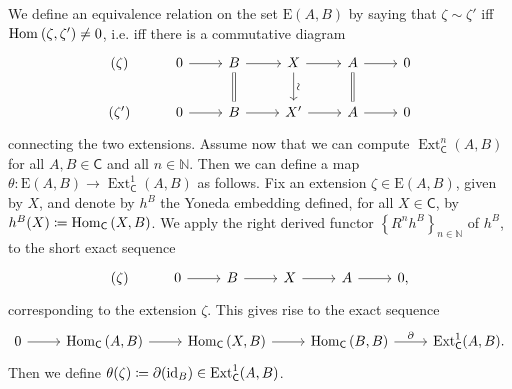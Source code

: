 \begin{rem}[]\label{rem:YonedaExensionTheta}
	We define an equivalence relation on the set $\mathrm{E}(A,B)$ by
	saying that $\zeta \sim \zeta'$ 
	iff $\operatorname{Hom}_{  } \left( \zeta, \zeta' \right) \neq 0$,
	i.e. iff there is a commutative diagram
	\begin{equation*}
	\begin{tikzcd}
		(\zeta) &
		0 \arrow[r, "", rightarrow] &
		B \arrow[r, "", rightarrow] 
		\arrow[d, "", equals] &
		X \arrow[r, "", rightarrow] 
		\arrow[d, "\rotatebox{90}{\(\sim\)}", rightarrow] &
		A \arrow[r, "", rightarrow] 
		\arrow[d, "", equals] &
		0\\
		(\zeta') &
		0 \arrow[r, "", rightarrow] &
		B \arrow[r, "", rightarrow] &
		X' \arrow[r, "", rightarrow] &
		A \arrow[r, "", rightarrow] &
		0
	\end{tikzcd}
	\end{equation*}
	connecting the two extensions.
	Assume now that we can compute $\operatorname{Ext}^n_{\mathsf{C}}(A, B)$
	for all $A,B \in \mathsf{C}$ and all $n \in \mathbb{N}$.
	Then we can define a map $\theta\colon \mathrm{E}(A,B) \to 
	\operatorname{Ext}^1_{\mathsf{C}}(A,B)$ as follows.
	Fix an extension $\zeta \in \mathrm{E}(A,B)$, given by $X$,
	and denote by $h^B$ the Yoneda
	embedding defined, for all $X \in \mathsf{C}$, by
	$h^B(X) \coloneqq \operatorname{Hom}_{\mathsf{C}} \left( X, B \right)$.
	We apply the right derived functor 
	$\left\{ R^n h^B \right\}_{n \in \mathbb{N}}$ of $h^B$, 
	to the short exact sequence
	\begin{equation*}
	\begin{tikzcd}
		(\zeta) &
		0 \arrow[r, "", rightarrow] &
		B \arrow[r, "", rightarrow] &
		X \arrow[r, "", rightarrow] &
		A \arrow[r, "", rightarrow] &
		0
	,\end{tikzcd}
	\end{equation*}
	corresponding to the extension $\zeta$.
	This gives rise to the exact sequence
	\begin{equation*}
	\begin{tikzcd}
		0 \arrow[r, "", rightarrow] &
		\Hom_{\mathsf{C}} \left( A, B \right) \arrow[r, "", rightarrow] &
		\Hom_{\mathsf{C}} \left( X, B \right) \arrow[r, "", rightarrow] &
		\Hom_{\mathsf{C}} \left( B, B \right) \arrow[r, "\partial", rightarrow] &
		\operatorname{Ext}^1_{\mathsf{C}}(A,B)
	.\end{tikzcd}
	\end{equation*}
	Then we define $\theta(\zeta) \coloneqq \partial(\operatorname{id}_{ B }) \in \operatorname{Ext}^1_{\mathsf{C}}
	(A,B)$.
\end{rem}


